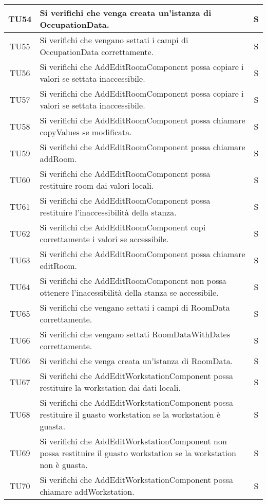 \begin{center}
\begin{longtable}{|c|p{10cm}|c|}
			\hline
			TU54 & Si verifichi che venga creata un'istanza di OccupationData. & S \\	
			\hline
			TU55 & Si verifichi che vengano settati i campi di OccupationData correttamente. & S \\	
			\hline
			TU56 & Si verifichi che AddEditRoomComponent possa copiare i valori se settata inaccessibile. & S \\	
			\hline
			TU57 & Si verifichi che AddEditRoomComponent possa copiare i valori se settata inaccessibile. & S \\	
			\hline
			TU58 & Si verifichi che AddEditRoomComponent possa chiamare copyValues se modificata. & S \\	
			\hline
			TU59 & Si verifichi che AddEditRoomComponent possa chiamare addRoom. & S \\	
			\hline
			TU60 & Si verifichi che AddEditRoomComponent possa restituire room dai valori locali. & S \\	
			\hline
			TU61 & Si verifichi che AddEditRoomComponent possa restituire l'inaccessibilità della stanza. & S \\	
			\hline
			TU62 & Si verifichi che AddEditRoomComponent copi correttamente i valori se accessibile. & S \\	
			\hline
			TU63 & Si verifichi che AddEditRoomComponent possa chiamare editRoom. & S \\	
			\hline
			TU64 & Si verifichi che AddEditRoomComponent non possa ottenere l'inacessibilità della stanza se accessibile. & S \\	
			\hline
			TU65 & Si verifichi che vengano settati i campi di RoomData correttamente. & S \\	
			\hline
			TU66 & Si verifichi che vengano settati RoomDataWithDates correttamente. & S \\	
			\hline
			TU66 & Si verifichi che venga creata un'istanza di RoomData. & S \\	
			\hline
			TU67 & Si verifichi che AddEditWorkstationComponent possa restituire la workstation dai dati locali. & S \\	
			\hline
			TU68 & Si verifichi che AddEditWorkstationComponent possa restituire il guasto workstation se la workstation è guasta. & S \\	
			\hline
			TU69 & Si verifichi che AddEditWorkstationComponent non possa restituire il guasto workstation se la workstation non è guasta. & S \\	
			\hline
			TU70 & Si verifichi che AddEditWorkstationComponent possa chiamare addWorkstation. & S \\	

\end{longtable}
\end{center}
